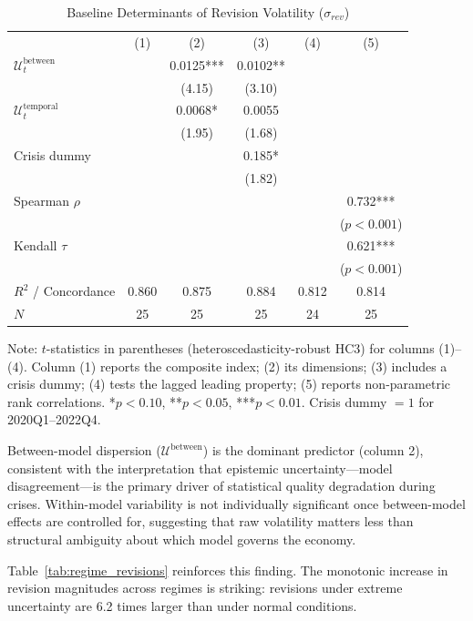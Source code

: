 \documentclass[12pt,a4paper]{article}
\theoremstyle{remark}
\begin{document}
\begin{table}[ht]
\centering
\begin{threeparttable}
\caption{Baseline Determinants of Revision Volatility ($\sigma_{rev}$)\label{tab:entropy_regression}}
\footnotesize
\begin{tabular}{lccccc}
\toprule
 & (1) & (2) & (3) & (4) & (5) \\
$\mathcal{U}^{\text{between}}_t$ & & 0.0125*** & 0.0102** & & \\
 & & (4.15) & (3.10) & & \\
$\mathcal{U}^{\text{temporal}}_t$ & & 0.0068* & 0.0055 & & \\
 & & (1.95) & (1.68) & & \\
Crisis dummy & & & 0.185* & & \\
 & & & (1.82) & & \\
\midrule
Spearman $\rho$ & & & & & 0.732*** \\
 & & & & & ($p < 0.001$) \\
Kendall $\tau$ & & & & & 0.621*** \\
 & & & & & ($p < 0.001$) \\
\midrule
$R^2$ / Concordance & 0.860 & 0.875 & 0.884 & 0.812 & 0.814 \\
$N$ & 25 & 25 & 25 & 24 & 25 \\
\bottomrule
\end{tabular}
\begin{tablenotes}
  \small \item Note: $t$-statistics in parentheses (heteroscedasticity-robust HC3) for columns (1)--(4). Column (1) reports the composite index; (2) its dimensions; (3) includes a crisis dummy; (4) tests the lagged leading property; (5) reports non-parametric rank correlations. *$p<0.10$, **$p<0.05$, ***$p<0.01$. Crisis dummy $= 1$ for 2020Q1--2022Q4.
\end{tablenotes}
\end{threeparttable}
\end{table}

Between-model dispersion ($\mathcal{U}^{\text{between}}$) is the dominant predictor
(column 2), consistent with the interpretation that epistemic uncertainty---model
disagreement---is the primary driver of statistical quality degradation during crises.
Within-model variability is not individually significant once between-model effects
are controlled for, suggesting that raw volatility matters less than structural
ambiguity about which model governs the economy.

Table~\ref{tab:regime_revisions} reinforces this finding. The monotonic increase in
revision magnitudes across regimes is striking: revisions under extreme uncertainty
are 6.2 times larger than under normal conditions.
\end{document}
